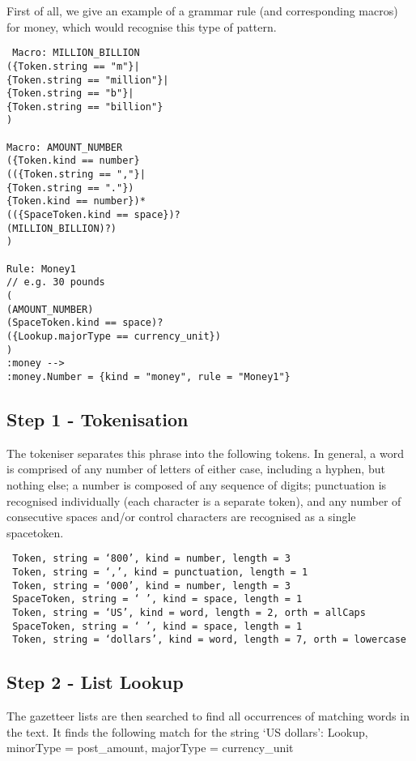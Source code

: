 \documentclass[a4paper,12pt]{report}
\begin{document}
First of all, we give an example of a grammar rule (and corresponding macros) for money,
which would recognise this type of pattern.

\begin{verbatim}
 Macro: MILLION_BILLION
({Token.string == "m"}|
{Token.string == "million"}|
{Token.string == "b"}|
{Token.string == "billion"}
)

Macro: AMOUNT_NUMBER
({Token.kind == number}
(({Token.string == ","}|
{Token.string == "."})
{Token.kind == number})*
(({SpaceToken.kind == space})?
(MILLION_BILLION)?)
)

Rule: Money1
// e.g. 30 pounds
(
(AMOUNT_NUMBER)
(SpaceToken.kind == space)?
({Lookup.majorType == currency_unit})
)
:money -->
:money.Number = {kind = "money", rule = "Money1"}
\end{verbatim}
\subsection{Step 1 - Tokenisation}

The tokeniser separates this phrase into the following tokens. In general, a word is comprised
of any number of letters of either case, including a hyphen, but nothing else; a number is
composed of any sequence of digits; punctuation is recognised individually (each character
is a separate token), and any number of consecutive spaces and/or control characters are
recognised as a single spacetoken.

\begin{verbatim}
 Token, string = ‘800’, kind = number, length = 3
 Token, string = ‘,’, kind = punctuation, length = 1
 Token, string = ‘000’, kind = number, length = 3
 SpaceToken, string = ‘ ’, kind = space, length = 1
 Token, string = ‘US’, kind = word, length = 2, orth = allCaps
 SpaceToken, string = ‘ ’, kind = space, length = 1
 Token, string = ‘dollars’, kind = word, length = 7, orth = lowercase
\end{verbatim}


\subsection{Step 2 - List Lookup}

The gazetteer lists are then searched to find all occurrences of matching words in the text.
It finds the following match for the string ‘US dollars’:
Lookup, minorType = post\_amount, majorType = currency\_unit
\end{document}
